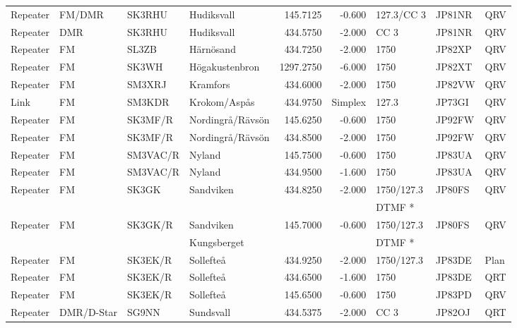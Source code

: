 \begin{landscape}
\begin{longtable}{llllrrlll}
Repeater   & FM/DMR     & SK3RHU   & Hudiksvall       & 145.7125    & -0.600   & 127.3/CC 3 & JP81NR & QRV  \\
Repeater   & DMR        & SK3RHU   & Hudiksvall       & 434.5750    & -2.000   & CC 3       & JP81NR & QRV  \\
Repeater   & FM         & SL3ZB    & Härnösand        & 434.7250    & -2.000   & 1750       & JP82XP & QRV  \\
Repeater   & FM         & SK3WH    & Högakustenbron   & 1297.2750   & -6.000   & 1750       & JP82XT & QRV  \\
Repeater   & FM         & SM3XRJ   & Kramfors         & 434.6000    & -2.000   & 1750       & JP82VW & QRV  \\
Link       & FM         & SM3KDR   & Krokom/Aspås     & 434.9750    & Simplex  & 127.3      & JP73GI & QRV  \\
Repeater   & FM         & SK3MF/R  & Nordingrå/Rävsön & 145.6250    & -0.600   & 1750       & JP92FW & QRV  \\
Repeater   & FM         & SK3MF/R  & Nordingrå/Rävsön & 434.8500    & -2.000   & 1750       & JP92FW & QRV  \\
Repeater   & FM         & SM3VAC/R & Nyland           & 145.7500    & -0.600   & 1750       & JP83UA & QRV  \\
Repeater   & FM         & SM3VAC/R & Nyland           & 434.9500    & -1.600   & 1750       & JP83UA & QRV  \\
Repeater   & FM         & SK3GK    & Sandviken        & 434.8250    & -2.000   & 1750/127.3 & JP80FS & QRV  \\
           &            &          &                  &             &          & DTMF *     &        &      \\
Repeater   & FM         & SK3GK/R  & Sandviken        & 145.7000    & -0.600   & 1750/127.3 & JP80FS & QRV  \\
           &            &          & Kungsberget      &             &          & DTMF *     &        &      \\
Repeater   & FM         & SK3EK/R  & Sollefteå        & 434.9250    & -2.000   & 1750/127.3 & JP83DE & Plan \\
Repeater   & FM         & SK3EK/R  & Sollefteå        & 434.6500    & -1.600   & 1750       & JP83DE & QRT  \\
Repeater   & FM         & SK3EK/R  & Sollefteå        & 145.6500    & -0.600   & 1750       & JP83PD & QRV  \\
Repeater   & DMR/D-Star & SG9NN    & Sundsvall        & 434.5375    & -2.000   & CC 3       & JP82OJ & QRT  \\

\end{longtable}
\end{landscape}
